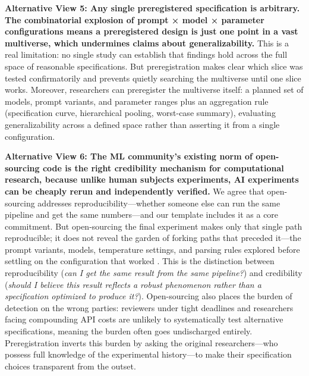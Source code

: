 \documentclass{article}
\theoremstyle{plain}
\theoremstyle{definition}
\theoremstyle{remark}
\begin{document}
\textbf{Alternative View 5: Any single preregistered specification is arbitrary. The combinatorial explosion of prompt × model × parameter configurations means a preregistered design is just one point in a vast multiverse, which undermines claims about generalizability.} This is a real limitation: no single study can establish that findings hold across the full space of reasonable specifications. But preregistration makes clear which slice was tested confirmatorily and prevents quietly searching the multiverse until one slice works. Moreover, researchers can preregister the multiverse itself: a planned set of models, prompt variants, and parameter ranges plus an aggregation rule (specification curve, hierarchical pooling, worst-case summary), evaluating generalizability across a defined space rather than asserting it from a single configuration.

\textbf{Alternative View 6: The ML community's existing norm of open-sourcing code is the right credibility mechanism for computational research, because unlike human subjects experiments, AI experiments can be cheaply rerun and independently verified.} We agree that open-sourcing addresses reproducibility—whether someone else can run the same pipeline and get the same numbers—and our template includes it as a core commitment. But open-sourcing the final experiment makes only that single path reproducible; it does not reveal the garden of forking paths that preceded it—the prompt variants, models, temperature settings, and parsing rules explored before settling on the configuration that worked \citep{gelman2013forkingpaths}. This is the distinction between reproducibility (\textit{can I get the same result from the same pipeline?}) and credibility (\textit{should I believe this result reflects a robust phenomenon rather than a specification optimized to produce it?}). Open-sourcing also places the burden of detection on the wrong parties: reviewers under tight deadlines and researchers facing compounding API costs are unlikely to systematically test alternative specifications, meaning the burden often goes undischarged entirely. Preregistration inverts this burden by asking the original researchers—who possess full knowledge of the experimental history—to make their specification choices transparent from the outset.
\end{document}
